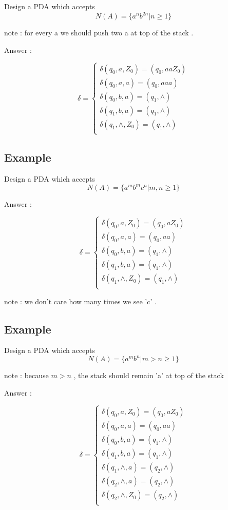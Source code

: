 \documentclass[12pt]{book}
\begin{document}
Design a PDA which accepts 
$$
N(A) = \{ a^{n} b^{2n} | n \geq 1 \}
$$

note : for every a we should push two a at top of the stack .


Answer :

$$
\delta = 
\begin{cases}
\delta(q_{0},a,Z_{0}) = (q_{0}, aaZ_{0}) \\
\delta(q_{0},a,a) = (q_{0},aaa) \\
\delta(q_{0},b,a) = (q_{1},\wedge) \\
\delta(q_{1},b,a) = (q_{1},\wedge) \\
\delta(q_{1},\wedge,Z_{0}) = (q_{1},\wedge) \\
\end{cases}
$$





\subsection{Example}

Design a PDA which accepts 
$$
N(A) = \{ a^{m} b^{m} c^{n} | m, n \geq 1 \}
$$



Answer :

$$
\delta = 
\begin{cases}
\delta(q_{0},a,Z_{0}) = (q_{0}, aZ_{0}) \\
\delta(q_{0},a,a) = (q_{0},aa) \\
\delta(q_{0},b,a) = (q_{1},\wedge) \\
\delta(q_{1},b,a) = (q_{1},\wedge) \\
\delta(q_{1},\wedge,Z_{0}) = (q_{1},\wedge) \\
\end{cases}
$$

note : we don't care how many times we see 'c' .



\subsection{Example}

Design a PDA which accepts 
$$
N(A) = \{ a^{m} b^{n} | m > n \geq 1 \}
$$

note : because $m > n$ , the stack should remain 'a' at top of the stack

Answer :

$$
\delta = 
\begin{cases}
\delta(q_{0},a,Z_{0}) = (q_{0}, aZ_{0}) \\
\delta(q_{0},a,a) = (q_{0},aa) \\
\delta(q_{0},b,a) = (q_{1},\wedge) \\
\delta(q_{1},b,a) = (q_{1},\wedge) \\
\delta(q_{1},\wedge,a) = (q_{2},\wedge) \\
\delta(q_{2},\wedge,a) = (q_{2},\wedge) \\
\delta(q_{2},\wedge,Z_{0}) = (q_{2}, \wedge) \\
\end{cases}
$$
\end{document}
